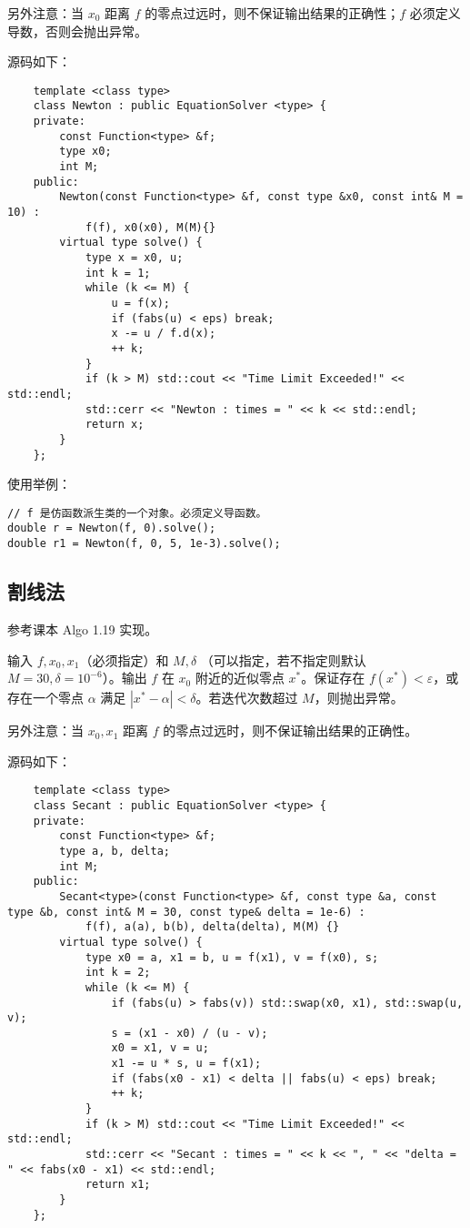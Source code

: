 \documentclass{ctexart}
\begin{document}
另外注意：当 $x_0$ 距离 $f$ 的零点过远时，则不保证输出结果的正确性；$f$ 必须定义导数，否则会抛出异常。

源码如下：
\begin{verbatim}
    template <class type>
    class Newton : public EquationSolver <type> {
    private:
        const Function<type> &f;
        type x0;
        int M;
    public:
        Newton(const Function<type> &f, const type &x0, const int& M = 10) :
            f(f), x0(x0), M(M){}
        virtual type solve() {
            type x = x0, u;
            int k = 1;
            while (k <= M) {
                u = f(x);
                if (fabs(u) < eps) break;
                x -= u / f.d(x);
                ++ k;
            }
            if (k > M) std::cout << "Time Limit Exceeded!" << std::endl;
            std::cerr << "Newton : times = " << k << std::endl;
            return x;
        }
    };
\end{verbatim}

使用举例：
\begin{verbatim}
// f 是仿函数派生类的一个对象。必须定义导函数。
double r = Newton(f, 0).solve();
double r1 = Newton(f, 0, 5, 1e-3).solve();
\end{verbatim}

\subsection{割线法}
参考课本 Algo 1.19 实现。

输入 $f,x_0,x_1$（必须指定）和 $M,\delta$ （可以指定，若不指定则默认 $M=30,\delta=10^{-6}$）。输出 $f$ 在 $x_0$ 附近的近似零点 $x^*$。保证存在 $f(x^*)<\varepsilon$，或存在一个零点 $\alpha$ 满足 $|x^*-\alpha|<\delta$。若迭代次数超过 $M$，则抛出异常。

另外注意：当 $x_0,x_1$ 距离 $f$ 的零点过远时，则不保证输出结果的正确性。

源码如下：
\begin{verbatim}
    template <class type>
    class Secant : public EquationSolver <type> {
    private:
        const Function<type> &f;
        type a, b, delta;
        int M;
    public:
        Secant<type>(const Function<type> &f, const type &a, const type &b, const int& M = 30, const type& delta = 1e-6) :
            f(f), a(a), b(b), delta(delta), M(M) {}
        virtual type solve() {
            type x0 = a, x1 = b, u = f(x1), v = f(x0), s;
            int k = 2;
            while (k <= M) {
                if (fabs(u) > fabs(v)) std::swap(x0, x1), std::swap(u, v);
                s = (x1 - x0) / (u - v);
                x0 = x1, v = u;
                x1 -= u * s, u = f(x1);
                if (fabs(x0 - x1) < delta || fabs(u) < eps) break;
                ++ k;
            }
            if (k > M) std::cout << "Time Limit Exceeded!" << std::endl;
            std::cerr << "Secant : times = " << k << ", " << "delta = " << fabs(x0 - x1) << std::endl;
            return x1;
        }
    };
\end{verbatim}
\end{document}
